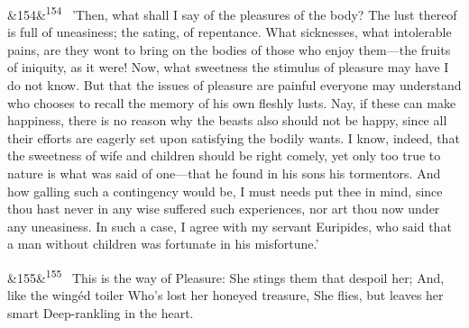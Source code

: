 \documentclass[12pt]{article}
\newcommand{\para}[1][]{\par\noindent\ifx&#1&\else\textsuperscript{\footnotesize #1}~\fi}
\begin{document}
\para[154] 'Then, what shall I say of the pleasures of the body? The lust thereof is full of uneasiness; the sating, of repentance. What sicknesses, what intolerable pains, are they wont to bring on the bodies of those who enjoy them---the fruits of iniquity, as it were! Now, what sweetness the stimulus of pleasure may have I do not know. But that the issues of pleasure are painful everyone may understand who chooses to recall the memory of his own fleshly lusts. Nay, if these can make happiness, there is no reason why the beasts also should not be happy, since all their efforts are eagerly set upon satisfying the bodily wants. I know, indeed, that the sweetness of wife and children should be right comely, yet only too true to nature is what was said of one---that he found in his sons his tormentors. And how galling such a contingency would be, I must needs put thee in mind, since thou hast never in any wise suffered such experiences, nor art thou now under any uneasiness. In such a case, I agree with my servant Euripides, who said that a man without children was fortunate in his misfortune.'

\para[155] This is the way of Pleasure: She stings them that despoil her; And, like the wingéd toiler Who's lost her honeyed treasure, She flies, but leaves her smart Deep-rankling in the heart.
\end{document}
